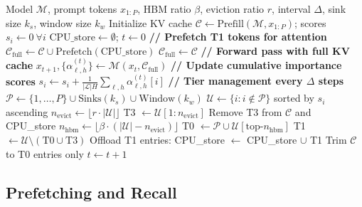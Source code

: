 \documentclass{article}
\begin{document}
\begin{algorithm}[t]
\caption{Semantics-Aware Memory Hierarchy for LLM Reasoning}
\label{alg:hierarchy}
\begin{algorithmic}[1]
\REQUIRE Model $\mathcal{M}$, prompt tokens $x_{1:P}$, HBM ratio $\beta$, eviction ratio $r$, interval $\Delta$, sink size $k_s$, window size $k_w$
\STATE Initialize KV cache $\mathcal{C} \leftarrow \text{Prefill}(\mathcal{M}, x_{1:P})$; scores $s_i \leftarrow 0\ \forall i$
\STATE $\text{CPU\_store} \leftarrow \emptyset$; \quad $t \leftarrow 0$
    \STATE \textbf{// Prefetch T1 tokens for attention}
        \STATE $\mathcal{C}_{\text{full}} \leftarrow \mathcal{C} \cup \text{Prefetch}(\text{CPU\_store})$ \quad {}
    \ELSE
        \STATE $\mathcal{C}_{\text{full}} \leftarrow \mathcal{C}$
    \ENDIF
    \STATE \textbf{// Forward pass with full KV cache}
    \STATE $x_{t+1}, \{\alpha^{(t)}_{\ell,h}\} \leftarrow \mathcal{M}(x_t, \mathcal{C}_{\text{full}})$
    \STATE \textbf{// Update cumulative importance scores}
        \STATE $s_i \leftarrow s_i + \frac{1}{|{\mathcal{L}}|H}\sum_{\ell,h} \alpha^{(t)}_{\ell,h}[i]$
    \ENDFOR
    \STATE \textbf{// Tier management every $\Delta$ steps}
        \STATE $\mathcal{P} \leftarrow \{1,\ldots,P\} \cup \text{Sinks}(k_s) \cup \text{Window}(k_w)$ \quad {}
        \STATE $\mathcal{U} \leftarrow \{i : i \notin \mathcal{P}\}$ sorted by $s_i$ ascending
        \STATE $n_{\text{evict}} \leftarrow \lfloor r \cdot |\mathcal{U}| \rfloor$
        \STATE T3 $\leftarrow \mathcal{U}[1:n_{\text{evict}}]$ \quad {}
        \STATE Remove T3 from $\mathcal{C}$ and CPU\_store
        \STATE $n_{\text{hbm}} \leftarrow \lfloor \beta \cdot (|\mathcal{U}| - n_{\text{evict}}) \rfloor$
        \STATE T0 $\leftarrow \mathcal{P} \cup \mathcal{U}[\text{top-}n_{\text{hbm}}]$ \quad {}
        \STATE T1 $\leftarrow \mathcal{U} \setminus (\text{T0} \cup \text{T3})$ \quad {}
        \STATE Offload T1 entries: CPU\_store $\leftarrow$ CPU\_store $\cup$ T1 \quad {}
        \STATE Trim $\mathcal{C}$ to T0 entries only
    \ENDIF
    \STATE $t \leftarrow t + 1$
\ENDWHILE
\end{algorithmic}
\end{algorithm}

\subsection{Prefetching and Recall}
\end{document}
